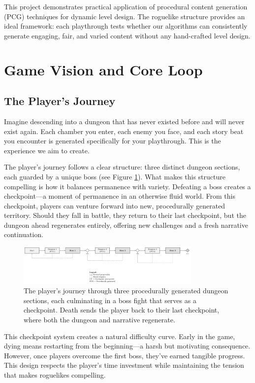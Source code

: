 \documentclass[11pt]{article}
\begin{document}
This project demonstrates practical application of procedural content generation (PCG) techniques for dynamic level design. The roguelike structure provides an ideal framework: each playthrough tests whether our algorithms can consistently generate engaging, fair, and varied content without any hand-crafted level design.

\section{Game Vision and Core Loop}
\label{sec:concept}

\subsection{The Player's Journey}

Imagine descending into a dungeon that has never existed before and will never exist again. Each chamber you enter, each enemy you face, and each story beat you encounter is generated specifically for your playthrough. This is the experience we aim to create.

The player's journey follows a clear structure: three distinct dungeon sections, each guarded by a unique boss (see Figure \ref{fig:game_flow}). What makes this structure compelling is how it balances permanence with variety. Defeating a boss creates a checkpoint—a moment of permanence in an otherwise fluid world. From this checkpoint, players can venture forward into new, procedurally generated territory. Should they fall in battle, they return to their last checkpoint, but the dungeon ahead regenerates entirely, offering new challenges and a fresh narrative continuation.

\begin{figure}[H]
    \centering
    \includegraphics[width=0.8\textwidth]{figures/game_flow.png}
    \caption{The player's journey through three procedurally generated dungeon sections, each culminating in a boss fight that serves as a checkpoint. Death sends the player back to their last checkpoint, where both the dungeon and narrative regenerate.}
    \label{fig:game_flow}
\end{figure}

This checkpoint system creates a natural difficulty curve. Early in the game, dying means restarting from the beginning—a harsh but motivating consequence. However, once players overcome the first boss, they've earned tangible progress. This design respects the player's time investment while maintaining the tension that makes roguelikes compelling.
\end{document}
